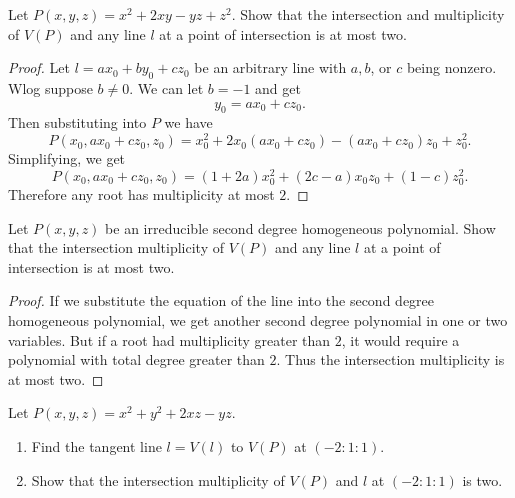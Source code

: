 \begin{tcolorbox}[title=Problem 13, breakable]
    Let $P(x, y, z) = x^2 + 2xy - yz + z^2$.
    Show that the intersection and multiplicity of $V(P)$
    and any line $l$ at a point of intersection is at most two.
\end{tcolorbox}

\begin{proof}
    Let $l = a x_0 + b y_0 + c z_0$ be an arbitrary line with $a, b$, or $c$ being nonzero.
    Wlog suppose $b \ne 0$. We can let $b = -1$ and get 
    \[y_0 = a x_0 + c z_0.\]
    Then substituting into $P$ we have 
    \[
        P(x_0, a x_0 + c z_0, z_0) = x_0^2 + 2 x_0 (a x_0 + c z_0) - (a x_0 + c z_0) z_0 + z_0^2.
    \]
    Simplifying, we get
    \[
        P(x_0, a x_0 + c z_0, z_0) = (1 + 2a)x_0^2 + (2c - a)x_0 z_0 + (1 - c) z_0^2.
    \]
    Therefore any root has multiplicity at most $2$.
\end{proof}

\begin{tcolorbox}[title=Problem 14, breakable]
    Let $P(x, y, z)$ be an irreducible second degree homogeneous polynomial.
    Show that the intersection multiplicity of $V(P)$ and any line $l$ at a point 
    of intersection is at most two.
\end{tcolorbox}

\begin{proof}
    If we substitute the equation of the line into the second degree homogeneous polynomial, 
    we get another second degree polynomial in one or two variables. 
    But if a root had multiplicity greater than $2$, it would require a polynomial with total degree greater than $2$.
    Thus the intersection multiplicity is at most two.
\end{proof}

\begin{tcolorbox}[title=Problem 15, breakable]
    Let $P(x, y, z) = x^2 + y^2 + 2xz - yz$.
    \begin{enumerate}
        \item Find the tangent line $l = V(l)$ to $V(P)$ at $(-2 : 1 : 1)$.
        \item Show that the intersection multiplicity of $V(P)$ and $l$ at 
        $(-2 : 1 : 1)$ is two.
    \end{enumerate}
\end{tcolorbox}

